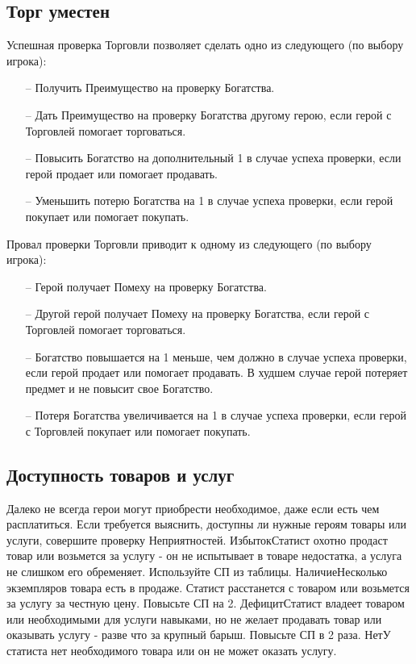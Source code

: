 \subsection{Торг уместен}
Успешная проверка Торговли позволяет сделать одно из следующего (по выбору игрока):
\begin{itemize}
\item[--] Получить Преимущество на проверку Богатства.
\item[--] Дать Преимущество на проверку Богатства другому герою, если герой с Торговлей помогает торговаться.
\item[--] Повысить Богатство на дополнительный 1 в случае успеха проверки, если герой продает или помогает продавать.
\item[--] Уменьшить потерю Богатства на 1 в случае успеха проверки, если герой покупает или помогает покупать.
\end{itemize}
Провал проверки Торговли приводит к одному из следующего (по выбору игрока):
\begin{itemize}
\item[--] Герой получает Помеху на проверку Богатства.
\item[--] Другой герой получает Помеху на проверку Богатства, если герой с Торговлей помогает торговаться.
\item[--] Богатство повышается на 1 меньше, чем должно в случае успеха проверки, если герой продает или помогает продавать. В худшем случае герой потеряет предмет и не повысит свое Богатство.
\item[--] Потеря Богатства увеличивается на 1 в случае успеха проверки, если герой с Торговлей покупает или помогает покупать.
\end{itemize}

\subsection{Доступность товаров и услуг}
Далеко не всегда герои могут приобрести необходимое, даже если есть чем расплатиться. Если требуется выяснить, доступны ли нужные героям товары или услуги, совершите проверку Неприятностей.
\trouble
{Избыток}{Статист охотно продаст товар или возьмется за услугу - он не испытывает в товаре недостатка, а услуга не слишком его обременяет. Используйте СП из таблицы.}
{Наличие}{Несколько экземпляров товара есть в продаже. Статист расстанется с товаром или возьмется за услугу за честную цену. Повысьте СП на 2.}
{Дефицит}{Статист владеет товаром или необходимыми для услуги навыками, но не желает продавать товар или оказывать услугу - разве что за крупный барыш. Повысьте СП в 2 раза.}
{Нет}{У статиста нет необходимого товара или он не может оказать услугу.}
